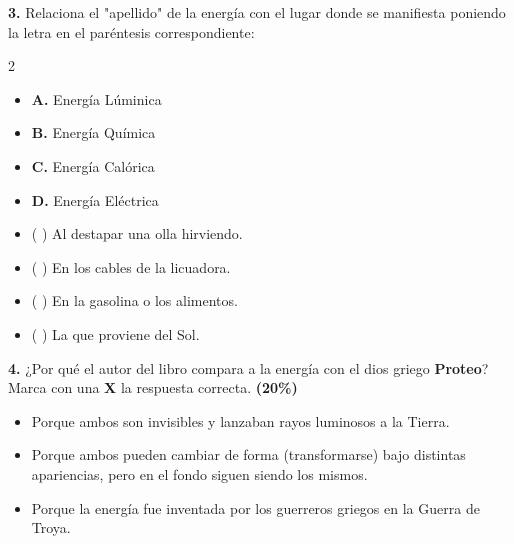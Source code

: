 \documentclass[12pt, letterpaper]{article}
\newif\ifshowanswers
\newcommand{\casillaVerdadera}{\ifshowanswers \textcolor{blue}{$\blacksquare$} \else $\square$ \fi}
\newcommand{\casillaFalsa}{\ifshowanswers $\square$ \else $\square$ \fi}
\begin{document}
	\vspace{0.5cm}
	\noindent \textbf{3.} Relaciona el "apellido" de la energía con el lugar donde se manifiesta poniendo la letra en el paréntesis correspondiente:
	
	\vspace{0.3cm}
	\begin{multicols}{2}
		\begin{itemize}[itemsep=0.5cm, label={}]
			\item \textbf{A.} Energía Lúminica
			\item \textbf{B.} Energía Química
			\item \textbf{C.} Energía Calórica
			\item \textbf{D.} Energía Eléctrica
		\end{itemize}
		\columnbreak
		\begin{itemize}[itemsep=0.5cm, label={}]
			\item ( \ifshowanswers \textcolor{blue}{\textbf{C}} \else \hspace{0.5cm} \fi ) Al destapar una olla hirviendo.
			\item ( \ifshowanswers \textcolor{blue}{\textbf{D}} \else \hspace{0.5cm} \fi ) En los cables de la licuadora.
			\item ( \ifshowanswers \textcolor{blue}{\textbf{B}} \else \hspace{0.5cm} \fi ) En la gasolina o los alimentos.
			\item ( \ifshowanswers \textcolor{blue}{\textbf{A}} \else \hspace{0.5cm} \fi ) La que proviene del Sol.
		\end{itemize}
	\end{multicols} 
	\newpage
	\vspace*{0.5cm} 
	\noindent \textbf{4.} ¿Por qué el autor del libro compara a la energía con el dios griego \textbf{Proteo}? Marca con una \textbf{X} la respuesta correcta. \hfill\textbf{(20\%)}
	
	\vspace{0.3cm} 
	\begin{itemize}[itemsep=0.5cm] 
		\item[ \casillaFalsa ] Porque ambos son invisibles y lanzaban rayos luminosos a la Tierra. 
		\item[ \casillaVerdadera ] Porque ambos pueden cambiar de forma (transformarse) bajo distintas apariencias, pero en el fondo siguen siendo los mismos. 
		\item[ \casillaFalsa ] Porque la energía fue inventada por los guerreros griegos en la Guerra de Troya. 
	\end{itemize}
	
\end{document}

